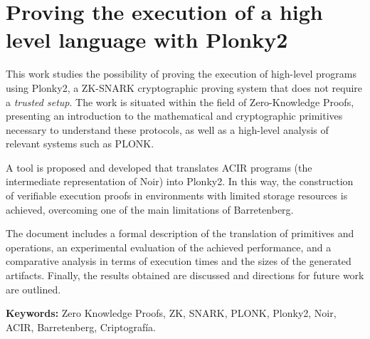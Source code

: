 \chapter*{Proving the execution of a high level language with Plonky2}

This work studies the possibility of proving the execution of high-level programs using Plonky2, a ZK-SNARK cryptographic proving system that does not require a \textit{trusted setup}. The work is situated within the field of Zero-Knowledge Proofs, presenting an introduction to the mathematical and cryptographic primitives necessary to understand these protocols, as well as a high-level analysis of relevant systems such as PLONK.


A tool is proposed and developed that translates ACIR programs (the intermediate representation of Noir) into Plonky2. In this way, the construction of verifiable execution proofs in environments with limited storage resources is achieved, overcoming one of the main limitations of Barretenberg.


The document includes a formal description of the translation of primitives and operations, an experimental evaluation of the achieved performance, and a comparative analysis in terms of execution times and the sizes of the generated artifacts. Finally, the results obtained are discussed and directions for future work are outlined.


\bigskip

\noindent\textbf{Keywords:} Zero Knowledge Proofs, ZK, SNARK, PLONK, Plonky2, Noir, ACIR, Barretenberg, Criptografía.